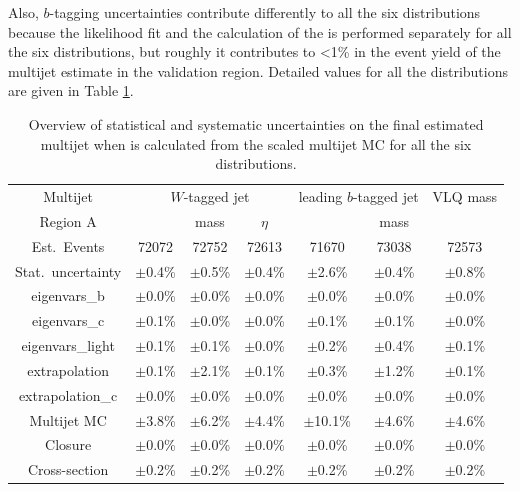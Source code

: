 Also, $b$-tagging uncertainties contribute differently to all the six distributions because the likelihood fit and the calculation of the \R is performed separately for all the six distributions, but roughly it contributes to <1\% in the event yield of the multijet estimate in the validation region. Detailed values for all the distributions are given in Table \ref{table:uncertainties:systematics:detail}.


\begin{table}[hbt!]
	\centering
	\begin{tabular}{c|c|c|c|c|c|c} 
		\toprule
		Multijet & \multicolumn{3}{c}{$W$-tagged jet} \vline & \multicolumn{2}{c}{leading $b$-tagged jet} \vline & VLQ mass\\ \cline{2-6}
		Region A & \pt & mass & $\eta$ & \pt & mass & \\ 
		\midrule
		Est.\ Events & \num{72072} & \num{72752} & \num{72613} & \num{71670} & \num{73038} & \num{72573} \\
		Stat.\ uncertainty & $\pm$0.4\% & $\pm$0.5\% & $\pm$0.4\% & $\pm$2.6\% & $\pm$0.4\% & $\pm$0.8\% \\
		\midrule
		eigenvars\_b & $\pm$0.0\% & $\pm$0.0\% & $\pm$0.0\% & $\pm$0.0\% & $\pm$0.0\% & $\pm$0.0\% \\
		eigenvars\_c & $\pm$0.1\% & $\pm$0.0\% & $\pm$0.0\% & $\pm$0.1\% & $\pm$0.1\% & $\pm$0.0\% \\
		eigenvars\_light & $\pm$0.1\% & $\pm$0.1\% & $\pm$0.0\% & $\pm$0.2\% & $\pm$0.4\% & $\pm$0.1\% \\
		extrapolation & $\pm$0.1\% & $\pm$2.1\% & $\pm$0.1\% & $\pm$0.3\% & $\pm$1.2\% & $\pm$0.1\% \\
		extrapolation\_c & $\pm$0.0\% & $\pm$0.0\% & $\pm$0.0\% & $\pm$0.0\% & $\pm$0.0\% & $\pm$0.0\% \\
		\midrule
		Multijet MC & $\pm$3.8\% & $\pm$6.2\% & $\pm$4.4\% & $\pm$10.1\% & $\pm$4.6\% & $\pm$4.6\% \\
		Closure & $\pm$0.0\% & $\pm$0.0\% & $\pm$0.0\% & $\pm$0.0\% & $\pm$0.0\% & $\pm$0.0\% \\
		Cross-section & $\pm$0.2\% & $\pm$0.2\% & $\pm$0.2\% & $\pm$0.2\% & $\pm$0.2\% & $\pm$0.2\% \\
		\bottomrule
	\end{tabular}
	\caption{Overview of statistical and systematic uncertainties on the final estimated multijet when \R is calculated from the scaled multijet MC for all the six distributions.}
	\label{table:uncertainties:systematics:detail}
\end{table}


